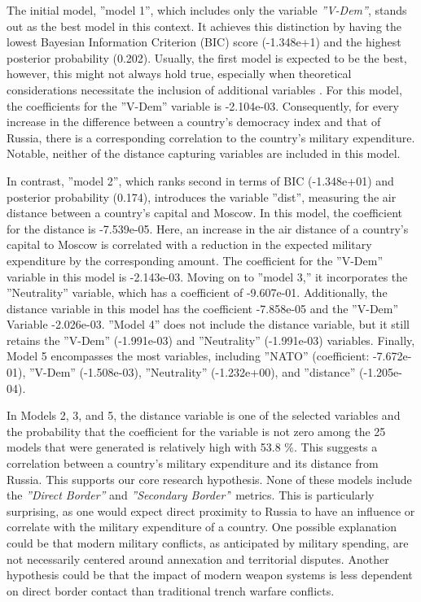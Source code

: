 \documentclass[12pt,a4paper]{article}
\begin{document}
The initial model, ''model 1'', which includes only the variable \textit{''V-Dem''}, stands out as the best model in this context. It achieves this distinction by having the lowest Bayesian Information Criterion (BIC) score (-1.348e+1) and the highest posterior probability (0.202). Usually, the first model is expected to be the best, however, this might not always hold true, especially when theoretical considerations necessitate the inclusion of additional variables \citep{starkweather2011}. For this model, the coefficients for the ''V-Dem'' variable is -2.104e-03. Consequently, for every increase in the difference between a country's democracy index and that of Russia, there is a corresponding correlation to the country's military expenditure. Notable, neither of the distance capturing variables are included in this model. 

In contrast, ''model 2'', which ranks second in terms of BIC (-1.348e+01) and posterior probability (0.174), introduces the variable ''dist'', measuring the air distance between a country's capital and Moscow. In this model, the coefficient for the distance is -7.539e-05. Here, an increase in the air distance of a country's capital to Moscow is correlated with a reduction in the expected military expenditure by the corresponding amount. The coefficient for the ''V-Dem'' variable in this model is -2.143e-03. Moving on to ''model 3,'' it incorporates the ''Neutrality'' variable, which has a coefficient of -9.607e-01. Additionally, the distance variable in this model has the coefficient -7.858e-05 and the ''V-Dem'' Variable -2.026e-03. ''Model 4'' does not include the distance variable, but it still retains the ''V-Dem'' (-1.991e-03) and ''Neutrality'' (-1.991e-03) variables. Finally, Model 5 encompasses the most variables, including ''NATO'' (coefficient: -7.672e-01), ''V-Dem'' (-1.508e-03), ''Neutrality'' (-1.232e+00), and ''distance'' (-1.205e-04).

In Models 2, 3, and 5, the distance variable is one of the selected variables and the probability that the coefficient for the variable is not zero among the 25 models that were generated is relatively high with 53.8 \%. This suggests a correlation between a country's military expenditure and its distance from Russia. This supports our core research hypothesis. None of these models include the \textit{''Direct Border''} and \textit{''Secondary Border'}' metrics. This is particularly surprising, as one would expect direct proximity to Russia to have an influence or correlate with the military expenditure of a country. One possible explanation could be that modern military conflicts, as anticipated by military spending, are not necessarily centered around annexation and territorial disputes. Another hypothesis could be that the impact of modern weapon systems is less dependent on direct border contact than traditional trench warfare conflicts.
\end{document}
